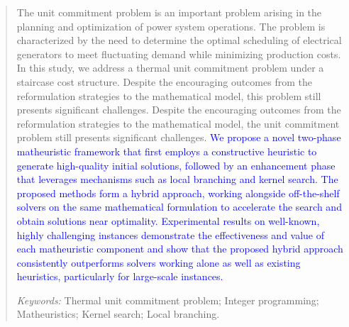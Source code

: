 \documentclass[letterpaper,titlepage,11pt]{article}
\begin{document}
\begin{abstract}
The unit commitment problem is an important problem 
arising in the planning and optimization of power system operations.
The problem is characterized by the need to determine the optimal scheduling of electrical generators to meet fluctuating demand while minimizing production costs.
In this study, we address a thermal unit commitment problem under
a staircase cost structure. 
Despite the encouraging outcomes from the reformulation strategies to the mathematical model, this problem still presents significant challenges.
%
Despite the encouraging outcomes from the reformulation strategies to the mathematical model, the unit commitment problem still presents significant challenges.
%
\textcolor{blue}{We propose a novel two-phase matheuristic framework that first employs a constructive heuristic to generate high-quality initial solutions, followed by an enhancement phase that leverages mechanisms such as local branching and kernel search. The proposed methods form a hybrid approach, working alongside off-the-shelf solvers on the same mathematical formulation to accelerate the search and obtain solutions near optimality.
Experimental results on well-known, highly challenging instances demonstrate the effectiveness and value of each matheuristic component and show that the proposed hybrid approach consistently outperforms solvers working alone as well as existing heuristics, particularly for large-scale instances.}


%
%


\vspace{1em}
\noindent\textit{Keywords:} Thermal unit commitment problem; Integer programming; Matheuristics; Kernel search; Local branching.
\end{abstract}











 


\newpage
\appendix

\end{document}
